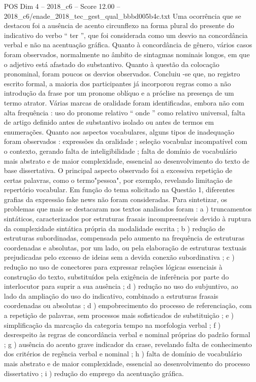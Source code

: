 \begin{textsample}{POS Dim 4 – 2018\_c6 – Score 12.00 – 2018\_c6/enade\_2018\_tec\_gest\_qual\_bbbd005b4c.txt}
Uma ocorrência que se destacou foi a ausência de acento circunflexo na forma plural do presente do indicativo do verbo “ ter ”, que foi considerada como um desvio na concordância verbal e não na acentuação gráfica.
Quanto à concordância de gênero, vários casos foram observados, normalmente no âmbito de sintagmas nominais longos, em que o adjetivo está afastado do substantivo.
Quanto à questão da colocação pronominal, foram poucos os desvios observados.
Concluiu -se que, no registro escrito formal, a maioria dos participantes já incorporou regras como a não introdução da frase por um pronome oblíquo e a próclise na presença de um termo atrator.
Várias marcas de oralidade foram identificadas, embora não com alta frequência : uso do pronome relativo “ onde ” como relativo universal, falta de artigo definido antes de substantivo isolado ou antes de termos em enumerações.
Quanto aos aspectos vocabulares, alguns tipos de inadequação foram observados : expressões da oralidade ; seleção vocabular incompatível com o contexto, gerando falta de inteligibilidade ; falta de domínio de vocabulário mais abstrato e de maior complexidade, essencial ao desenvolvimento do texto de base dissertativa.
O principal aspecto observado foi a excessiva repetição de certas palavras, como o termo"pessoa", por exemplo, revelando limitação de repertório vocabular.
Em função do tema solicitado na Questão 1, diferentes grafias da expressão fake news não foram consideradas.
Para sintetizar, os problemas que mais se destacaram nos textos analisados foram : a ) truncamentos sintáticos, caracterizados por estruturas frasais incompreensíveis devido à ruptura da complexidade sintática própria da modalidade escrita ; b ) redução de estruturas subordinadas, compensada pelo aumento na frequência de estruturas coordenadas e absolutas, por um lado, ou pela elaboração de estruturas textuais prejudicadas pelo excesso de ideias sem a devida conexão subordinativa ; c ) redução no uso de conectores para expressar relações lógicas essenciais à construção do texto, substituídos pela exigência de inferência por parte do interlocutor para suprir a sua ausência ; d ) redução no uso do subjuntivo, ao lado da ampliação do uso do indicativo, combinado a estruturas frasais coordenadas ou absolutas ; d ) empobrecimento do processo de referenciação, com a repetição de palavras, sem processos mais sofisticados de substituição ; e ) simplificação da marcação da categoria tempo na morfologia verbal ; f ) desrespeito às regras de concordância verbal e nominal próprias do padrão formal ; g ) ausência do acento grave indicador da crase, revelando falta de conhecimento dos critérios de regência verbal e nominal ; h ) falta de domínio de vocabulário mais abstrato e de maior complexidade, essencial ao desenvolvimento do processo dissertativo ; i ) redução do emprego da acentuação gráfica.

\end{textsample}
